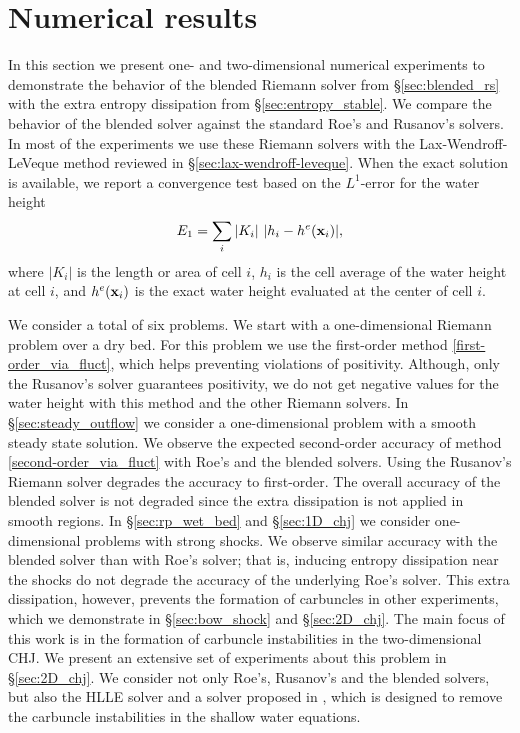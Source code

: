 \documentclass[preprint, 11pt]{article}
\newcommand{\bfx}{{\bf x}}
\begin{document}
\section{Numerical results}\label{sec:num}
In this section we present one- and two-dimensional numerical experiments to demonstrate the behavior of the
blended Riemann solver from \S\ref{sec:blended_rs} with the extra entropy dissipation from \S\ref{sec:entropy_stable}. 
We compare the behavior of the blended solver against the standard Roe's and Rusanov's solvers.
In most of the experiments we use these Riemann solvers with the Lax-Wendroff-LeVeque method reviewed in \S\ref{sec:lax-wendroff-leveque}.
When the exact solution is available, we report a convergence test based on the $L^1$-error for the water height
\begin{align*}
  E_1=\sum_i|K_i|~|h_i-h^e(\bfx_i)|,
\end{align*}
where $|K_i|$ is the length or area of cell $i$,
$h_i$ is the cell average of the water height at cell $i$,
and $h^e(\bfx_i)$ is the exact water height evaluated at the center of cell $i$.

We consider a total of six problems. We start with a one-dimensional Riemann problem over a dry bed. 
For this problem we use the first-order method \eqref{first-order_via_fluct},
which helps preventing violations of positivity. Although, only the Rusanov's solver guarantees
positivity, we do not get negative values for the water height with this method and the other Riemann solvers.
In \S \ref{sec:steady_outflow} we consider a one-dimensional problem with a smooth steady state solution. We observe the expected
second-order accuracy of method \eqref{second-order_via_fluct} with Roe's and the blended solvers. Using
the Rusanov's Riemann solver degrades the accuracy to first-order. The overall accuracy of the blended solver
is not degraded since the extra dissipation is not applied in smooth regions. 
In \S\ref{sec:rp_wet_bed} and \S\ref{sec:1D_chj} we consider one-dimensional problems with strong shocks. We observe similar accuracy with the
blended solver than with Roe's solver; that is, inducing entropy dissipation near the shocks do not degrade the accuracy
of the underlying Roe's solver. This extra dissipation, however, prevents the formation of carbuncles in other experiments,
which we demonstrate in \S \ref{sec:bow_shock} and \S\ref{sec:2D_chj}. 
The main focus of this work is in the formation of carbuncle instabilities in the two-dimensional CHJ. We present
an extensive set of experiments about this problem in \S \ref{sec:2D_chj}.
We consider not only Roe's, Rusanov's and the blended solvers, but also the HLLE solver and a solver proposed in \cite{kemm2014note},
which is designed to remove the carbuncle instabilities in the shallow water equations. 
\end{document}
